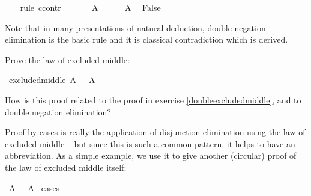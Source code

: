 \begin{isabellebody}
\ \ \isamarkupfalse%
\ {\isacharparenleft}rule\ ccontr{\isacharparenright}\isanewline
\ \ \ \ \isamarkupfalse%
\ {\isachardoublequoteopen}{\isasymnot}\ A{\isachardoublequoteclose}\isanewline
\ \ \ \ \isamarkupfalse%
\ {\isacharbackquoteopen}{\isasymnot}{\isasymnot}A{\isacharbackquoteclose}\ \isamarkupfalse%
\ {\isachardoublequoteopen}False{\isachardoublequoteclose}\isacommand{{\isachardot}{\isachardot}}\isamarkupfalse%
\isanewline
\ \ \isamarkupfalse%
\isanewline
{}\isamarkupfalse%
%
\endisatagproof
{\isafoldproof}%
%
\isadelimproof
%
\endisadelimproof
%
\begin{isamarkuptext}%
Note that in many presentations of natural deduction, double negation elimination is the basic
rule and it is classical contradiction which is derived.%
\end{isamarkuptext}\isamarkuptrue%
%
\begin{isamarkuptext}%
\begin{Exercise}[title = The Law of Excluded Middle]\label{excludedmiddle} 
Prove the law of excluded middle: \end{Exercise}%
\end{isamarkuptext}\isamarkuptrue%
\isamarkupfalse%
\ excluded{\isacharunderscore}middle{\isacharcolon}\ {\isachardoublequoteopen}A\ {\isasymor}\ {\isasymnot}\ A{\isachardoublequoteclose}%
\isadelimproof
\ %
\endisadelimproof
%
\isatagproof
{}\isamarkupfalse%
%
\endisatagproof
{\isafoldproof}%
%
\isadelimproof
%
\endisadelimproof
%
\begin{isamarkuptext}%
How is this proof related to the proof in exercise \ref{doubleexcludedmiddle}, and to double negation elimination?%
\end{isamarkuptext}\isamarkuptrue%
%
\isamarkuptrue%
%
\begin{isamarkuptext}%
Proof by cases is really the application of disjunction elimination using the law of excluded
middle -- but since this is such a common pattern, it helps to have an abbreviation. As a simple example,
we use it to give another (circular) proof of the law of excluded middle itself:%
\end{isamarkuptext}\isamarkuptrue%
\isamarkupfalse%
\ {\isachardoublequoteopen}A\ {\isasymor}\ {\isasymnot}\ A{\isachardoublequoteclose}\isanewline
%
\isadelimproof
%
\endisadelimproof
%
\isatagproof
{}\isamarkupfalse%
\ cases\isanewline

\end{isabellebody}
